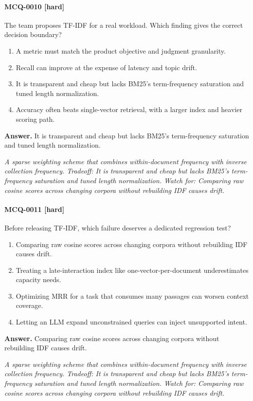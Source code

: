 \paragraph{MCQ-0010 [hard]} The team proposes TF-IDF for a real workload. Which finding gives the correct decision boundary?
\begin{enumerate}[label=\Alph*.]
\item A metric must match the product objective and judgment granularity.
\item Recall can improve at the expense of latency and topic drift.
\item It is transparent and cheap but lacks BM25's term-frequency saturation and tuned length normalization.
\item Accuracy often beats single-vector retrieval, with a larger index and heavier scoring path.
\end{enumerate}
\noindent\textbf{Answer.} It is transparent and cheap but lacks BM25's term-frequency saturation and tuned length normalization.
\par\textit{A sparse weighting scheme that combines within-document frequency with inverse collection frequency. Tradeoff: It is transparent and cheap but lacks BM25's term-frequency saturation and tuned length normalization. Watch for: Comparing raw cosine scores across changing corpora without rebuilding IDF causes drift.}
\paragraph{MCQ-0011 [hard]} Before releasing TF-IDF, which failure deserves a dedicated regression test?
\begin{enumerate}[label=\Alph*.]
\item Comparing raw cosine scores across changing corpora without rebuilding IDF causes drift.
\item Treating a late-interaction index like one-vector-per-document underestimates capacity needs.
\item Optimizing MRR for a task that consumes many passages can worsen context coverage.
\item Letting an LLM expand unconstrained queries can inject unsupported intent.
\end{enumerate}
\noindent\textbf{Answer.} Comparing raw cosine scores across changing corpora without rebuilding IDF causes drift.
\par\textit{A sparse weighting scheme that combines within-document frequency with inverse collection frequency. Tradeoff: It is transparent and cheap but lacks BM25's term-frequency saturation and tuned length normalization. Watch for: Comparing raw cosine scores across changing corpora without rebuilding IDF causes drift.}
